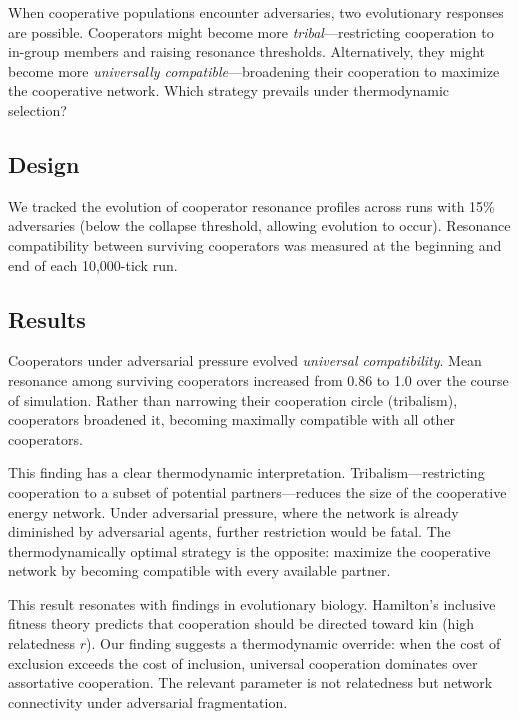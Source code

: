 \documentclass[12pt,a4paper]{article}
\begin{document}
When cooperative populations encounter adversaries, two evolutionary responses are possible. Cooperators might become more \emph{tribal}---restricting cooperation to in-group members and raising resonance thresholds. Alternatively, they might become more \emph{universally compatible}---broadening their cooperation to maximize the cooperative network. Which strategy prevails under thermodynamic selection?

\subsection{Design}

We tracked the evolution of cooperator resonance profiles across runs with 15\% adversaries (below the collapse threshold, allowing evolution to occur). Resonance compatibility between surviving cooperators was measured at the beginning and end of each 10{,}000-tick run.

\subsection{Results}

Cooperators under adversarial pressure evolved \emph{universal compatibility}. Mean resonance among surviving cooperators increased from 0.86 to 1.0 over the course of simulation. Rather than narrowing their cooperation circle (tribalism), cooperators broadened it, becoming maximally compatible with all other cooperators.

This finding has a clear thermodynamic interpretation. Tribalism---restricting cooperation to a subset of potential partners---reduces the size of the cooperative energy network. Under adversarial pressure, where the network is already diminished by adversarial agents, further restriction would be fatal. The thermodynamically optimal strategy is the opposite: maximize the cooperative network by becoming compatible with every available partner.

This result resonates with findings in evolutionary biology. Hamilton's inclusive fitness theory \citep{hamilton1964} predicts that cooperation should be directed toward kin (high relatedness $r$). Our finding suggests a thermodynamic override: when the cost of exclusion exceeds the cost of inclusion, universal cooperation dominates over assortative cooperation. The relevant parameter is not relatedness but network connectivity under adversarial fragmentation.

\end{document}
